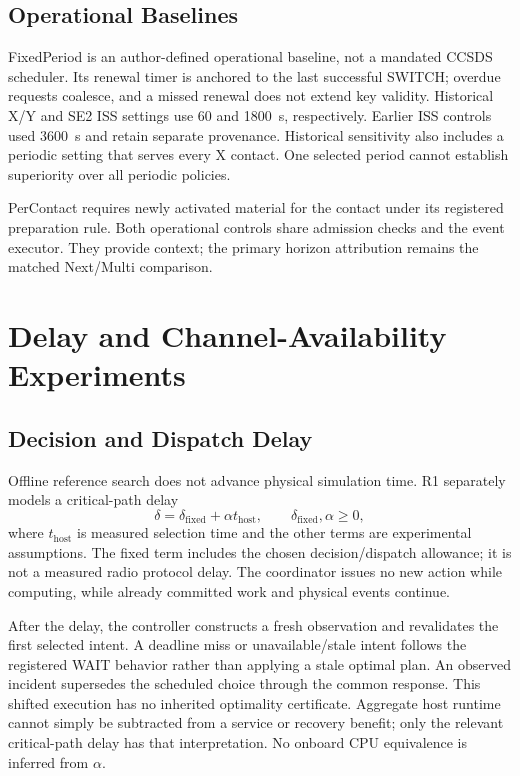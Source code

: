 \documentclass[conference]{IEEEtran}
\begin{document}
\subsection{Operational Baselines}
FixedPeriod is an author-defined operational baseline, not a mandated CCSDS scheduler. Its renewal timer is anchored to the last successful SWITCH; overdue requests coalesce, and a missed renewal does not extend key validity. Historical X/Y and SE2 ISS settings use 60 and 1800~s, respectively. Earlier ISS controls used 3600~s and retain separate provenance. Historical sensitivity also includes a periodic setting that serves every X contact. One selected period cannot establish superiority over all periodic policies.

PerContact requires newly activated material for the contact under its registered preparation rule. Both operational controls share admission checks and the event executor. They provide context; the primary horizon attribution remains the matched Next/Multi comparison.

\section{Delay and Channel-Availability Experiments}
\subsection{Decision and Dispatch Delay}
Offline reference search does not advance physical simulation time. R1 separately models a critical-path delay
\begin{equation}
\delta=\delta_{\mathrm{fixed}}+\alpha t_{\mathrm{host}},\qquad \delta_{\mathrm{fixed}},\alpha\geq0,
\end{equation}
where $t_{\mathrm{host}}$ is measured selection time and the other terms are experimental assumptions. The fixed term includes the chosen decision/dispatch allowance; it is not a measured radio protocol delay. The coordinator issues no new action while computing, while already committed work and physical events continue.

After the delay, the controller constructs a fresh observation and revalidates the first selected intent. A deadline miss or unavailable/stale intent follows the registered WAIT behavior rather than applying a stale optimal plan. An observed incident supersedes the scheduled choice through the common response. This shifted execution has no inherited optimality certificate. Aggregate host runtime cannot simply be subtracted from a service or recovery benefit; only the relevant critical-path delay has that interpretation. No onboard CPU equivalence is inferred from $\alpha$.
\end{document}
